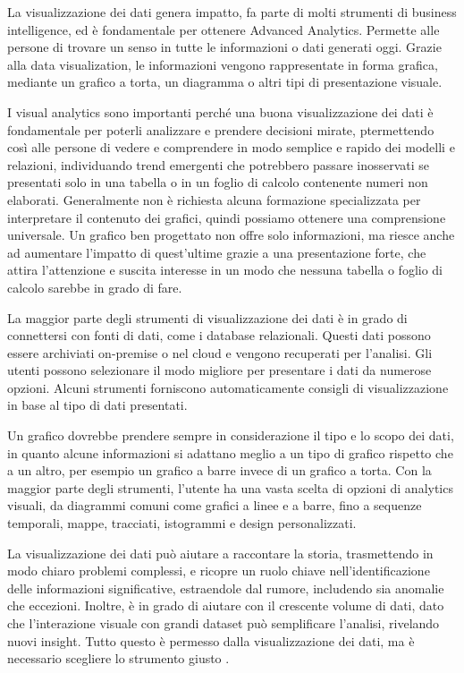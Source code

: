La visualizzazione dei dati genera impatto, fa parte di molti strumenti di business intelligence, ed è fondamentale per ottenere Advanced Analytics. Permette alle persone di trovare un senso in tutte le informazioni o dati generati oggi. Grazie alla data visualization, le informazioni vengono rappresentate in forma grafica, mediante un grafico a torta, un diagramma o altri tipi di presentazione visuale.

I visual analytics sono importanti perché una buona visualizzazione dei dati è fondamentale per poterli analizzare e prendere decisioni mirate, ptermettendo così alle persone di vedere e comprendere in modo semplice e rapido dei modelli e relazioni, individuando trend emergenti che potrebbero passare inosservati se presentati solo in una tabella o in un foglio di calcolo contenente numeri non elaborati. Generalmente non è richiesta alcuna formazione specializzata per interpretare il contenuto dei grafici, quindi possiamo ottenere una comprensione universale. Un grafico ben progettato non offre solo informazioni, ma riesce anche ad aumentare l'impatto di quest'ultime grazie a una presentazione forte, che attira l'attenzione e suscita interesse in un modo che nessuna tabella o foglio di calcolo sarebbe in grado di fare.

La maggior parte degli strumenti di visualizzazione dei dati è in grado di connettersi con fonti di dati, come i database relazionali. Questi dati possono essere archiviati on-premise o nel cloud e vengono recuperati per l'analisi. Gli utenti possono selezionare il modo migliore per presentare i dati da numerose opzioni. Alcuni strumenti forniscono automaticamente consigli di visualizzazione in base al tipo di dati presentati.

Un grafico dovrebbe prendere sempre in considerazione il tipo e lo scopo dei dati, in quanto alcune informazioni si adattano meglio a un tipo di grafico rispetto che a un altro, per esempio un grafico a barre invece di un grafico a torta. Con la maggior parte degli strumenti, l'utente ha una vasta scelta di opzioni di analytics visuali, da diagrammi comuni come grafici a linee e a barre, fino a sequenze temporali, mappe, tracciati, istogrammi e design personalizzati.

La visualizzazione dei dati può aiutare a raccontare la storia, trasmettendo in modo chiaro problemi complessi, e ricopre un ruolo chiave nell'identificazione delle informazioni significative, estraendole dal rumore, includendo sia anomalie che eccezioni. Inoltre, è in grado di aiutare con il crescente volume di dati, dato che l'interazione visuale con grandi dataset può semplificare l'analisi, rivelando nuovi insight. Tutto questo è permesso dalla visualizzazione dei dati, ma è necessario scegliere lo strumento giusto \cite{Oracle_Visualizzazione_Dati}.


